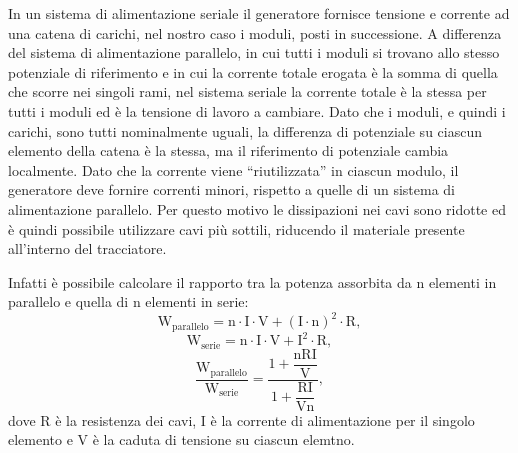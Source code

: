 In un sistema di alimentazione seriale il generatore fornisce tensione e corrente ad una catena di carichi, nel nostro caso i moduli, posti in successione. A differenza del sistema di alimentazione parallelo, in cui tutti i moduli si trovano allo stesso potenziale di riferimento e in cui la corrente totale erogata è la somma di quella che scorre nei singoli rami, nel sistema seriale la corrente totale è la stessa per tutti i moduli ed è la tensione di lavoro a cambiare. Dato che i moduli, e quindi i carichi, sono tutti nominalmente uguali, la differenza di potenziale su ciascun elemento della catena è la stessa, ma il riferimento di potenziale cambia localmente.
Dato che la corrente viene ``riutilizzata'' in ciascun modulo, il generatore deve fornire correnti minori, rispetto a quelle di un sistema di alimentazione parallelo.
Per questo motivo le dissipazioni nei cavi sono ridotte ed è quindi possibile utilizzare cavi più sottili, riducendo il materiale presente all'interno del tracciatore.

Infatti è possibile calcolare il rapporto tra la potenza assorbita da n elementi in parallelo e quella di n elementi in serie:
\begin{equation}
\mathrm{W_{parallelo} = n \cdot I \cdot V + (I\cdot n)^2 \cdot R},
\end{equation}
\begin{equation}
\mathrm{W_{serie} = n \cdot I \cdot V + I^2 \cdot R},
\end{equation}
\begin{equation}
\mathrm{\frac{W_{parallelo}}{W_{serie}} = \frac{1+ \dfrac{nRI}{V}}{1+\dfrac{RI}{Vn}}},
\end{equation}
dove R è la resistenza dei cavi, I è la corrente di alimentazione per il singolo elemento e V è la caduta di tensione su ciascun elemtno. 

